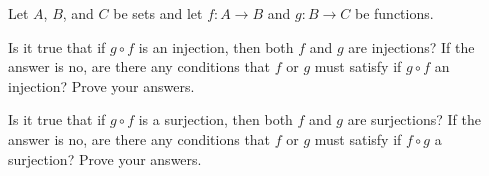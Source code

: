 \begin{comment}

\ExerciseSolution The function $f$ is not a surjection since $f((2,3)) = 2+3 = 5 = 4 + 1 = f((4,1))$. To determine if $f$ is a surjection, let $m \in \Z$. Then $f((m-1,1)) = (m-1)+1 = m$, so $f$ is a surjection.

\end{comment}


\item Let $A$, $B$, and $C$ be sets and let $f : A \to B$ and $g : B \to C$ be functions.
		\ba
		\item Is it true that if $g \circ f$ is an injection, then both $f$ and $g$ are injections? If the answer is no, are there any conditions that $f$ or $g$ must satisfy if $g \circ f$ an injection? Prove your answers.
		\item Is it true that if $g \circ f$ is a surjection, then both $f$ and $g$ are surjections? If the answer is no, are there any conditions that $f$ or $g$ must satisfy if $f \circ g$ a surjection? Prove your answers.  
		\ea
		
\begin{comment}

\ExerciseSolution

\ba

\item Let $A = C = \{1,2\}$ and $B = \{1,2,3\}$. Let $f: A \to B$ be defined by $f(x) = x$ and let $g: B \to C$ be defined by $g(1)=1$, $g(2) = 2$, and $g(3) = 2$. Then $(g \circ f)(1) = 1$ and $(g \circ f)(2) = 2$, so $g \circ f$ is an injection. However, since $g(2) = g(3)$, the function $g$ is not an injection.  

This example illustrates the general idea that if $g \circ f$ is an injection, then $f$ is an injection. To see why, suppose $g \circ f$ is an injection and let $x_1$ and $x_2$ be in $A$ such that $f(x_1) = f(x_2)$. Applying $g$ to both sides gives us $(g \circ f)(x_1) = (g \circ f)(x_2)$. But then the fact that $g \circ f$ is an injection implies that $x_1 = x_2$. Thus, $f$ is an injection. 

\item Let $A = \{1,2\} = C$, and $B = \{1,2,3\}$. Let $f: A \to B$ be defined by $f(x) = x$ and let $g: B \to C$ be defined by $g(1)=1$, $g(2) = 2$, and $g(3) = 2$. Then $(g \circ f)(1) = 1$ and $(g \circ f)(2) = 2$, so $g \circ f$ is a surjection. However, since there is no $x \in A$ with $f(x) = 3$, the function $f$ is not a surjection.  

This example illustrates the general idea that if $g \circ f$ is a surjection, then $g$ is a surjection. To see why, suppose $g \circ f$ is a surjection and let $z \in C$. The fact that $g \circ f$ is a surjection means that there is an element $x \in A$ with $(g \circ f)(x) = z$. It follows that $g(f(x)) = z$ and so $g$ is a surjection. 

\ea

\end{comment}

